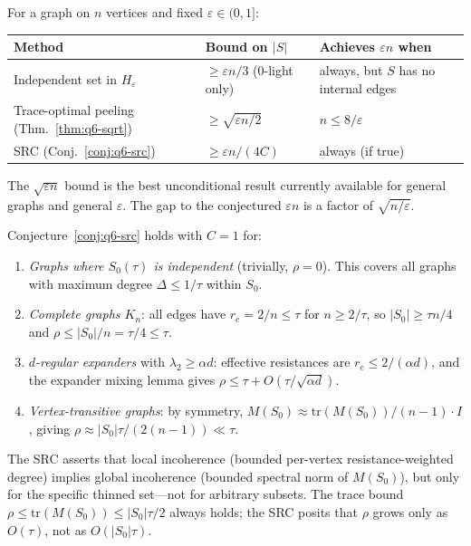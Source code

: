 \begin{remark}
For a graph on $n$ vertices and fixed $\varepsilon\in(0,1]$:
\begin{center}
\begin{tabular}{lll}
\hline
\textbf{Method} & \textbf{Bound on $|S|$}
  & \textbf{Achieves $\varepsilon n$ when}\\\hline
Independent set in $H_\varepsilon$
  & $\ge\varepsilon n/3$ (0-light only)
  & always, but $S$ has no internal edges\\
Trace-optimal peeling (Thm.~\ref{thm:q6-sqrt})
  & $\ge\sqrt{\varepsilon n/2}$
  & $n\le 8/\varepsilon$\\
SRC (Conj.~\ref{conj:q6-src})
  & $\ge\varepsilon n/(4C)$
  & always (if true)\\\hline
\end{tabular}
\end{center}
The $\sqrt{\varepsilon n}$ bound is the best unconditional result
currently available for general graphs and general $\varepsilon$.
The gap to the conjectured $\varepsilon n$ is a factor of
$\sqrt{n/\varepsilon}$.
\end{remark}

\begin{remark}\label{rem:q6-src-evidence}
Conjecture~\ref{conj:q6-src} holds with $C=1$ for:
\begin{enumerate}[nosep]
\item \emph{Graphs where $S_0(\tau)$ is independent} (trivially,
$\rho=0$). This covers all graphs with maximum degree
$\Delta\le 1/\tau$ within $S_0$.
\item \emph{Complete graphs $K_n$}: all edges have
$r_e=2/n\le\tau$ for $n\ge 2/\tau$, so $|S_0|\ge\tau n/4$
and $\rho\le|S_0|/n=\tau/4\le\tau$.
\item \emph{$d$-regular expanders} with $\lambda_2\ge\alpha d$:
effective resistances are $r_e\le 2/(\alpha d)$,
and the expander mixing lemma gives
$\rho\le\tau+O(\tau/\sqrt{\alpha d})$.
\item \emph{Vertex-transitive graphs}: by symmetry,
$M(S_0)\approx\mathrm{tr}(M(S_0))/(n-1)\cdot I$, giving
$\rho\approx|S_0|\tau/(2(n-1))\ll\tau$.
\end{enumerate}
The SRC asserts that local incoherence (bounded per-vertex
resistance-weighted degree) implies global incoherence
(bounded spectral norm of $M(S_0)$), but only for the specific
thinned set---not for arbitrary subsets.
The trace bound
$\rho\le\mathrm{tr}(M(S_0))\le|S_0|\tau/2$ always holds; the
SRC posits that $\rho$ grows only as $O(\tau)$, not as
$O(|S_0|\tau)$.
\end{remark}

